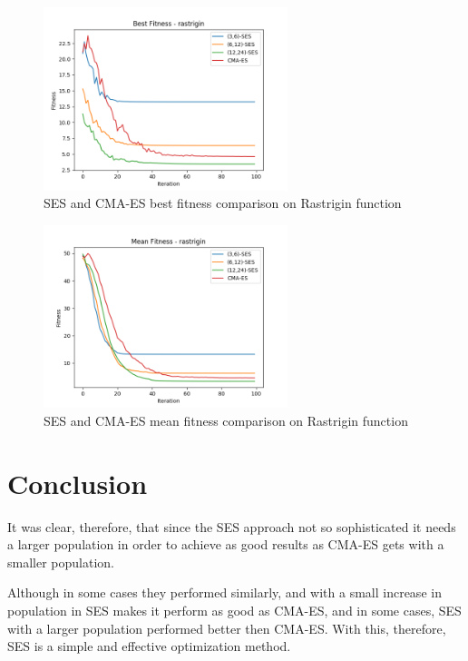 \begin{figure}
  \begin{center}
  \includegraphics[width=2.8in]{./../code/benchmark_results/best_fitness-rastrigin.png}
  \caption{SES and CMA-ES best fitness comparison on Rastrigin function}
  \label{img:best_fitness-rastrigin}
  \end{center}
\end{figure}

\begin{figure}
  \begin{center}
  \includegraphics[width=2.8in]{./../code/benchmark_results/mean_fitness-rastrigin.png}
  \caption{SES and CMA-ES mean fitness comparison on Rastrigin function}
  \label{img:mean_fitness-rastrigin}
  \end{center}
\end{figure}

\section {Conclusion}

It was clear, therefore, that since the SES approach not so sophisticated it needs a larger population in order to achieve as good results as CMA-ES gets with a smaller population.

Although in some cases they performed similarly, and with a small increase in population in SES makes it perform as good as CMA-ES, and in some cases, SES with a larger population performed better then CMA-ES. With this, therefore, SES is a simple and effective optimization method.

\vfill

